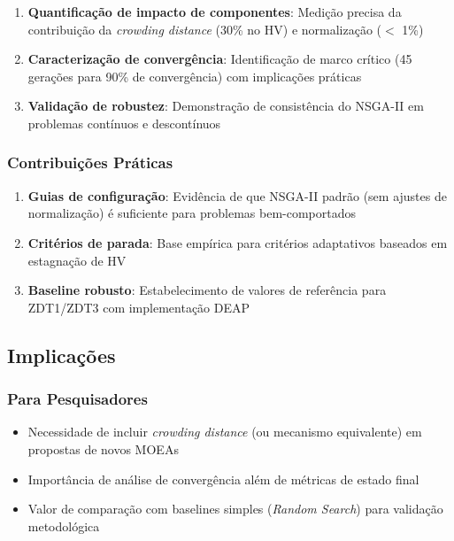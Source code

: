 \begin{enumerate}
    \item \textbf{Quantificação de impacto de componentes}: Medição precisa da contribuição da \textit{crowding distance} (30\% no HV) e normalização ($<$ 1\%)
    
    \item \textbf{Caracterização de convergência}: Identificação de marco crítico (45 gerações para 90\% de convergência) com implicações práticas
    
    \item \textbf{Validação de robustez}: Demonstração de consistência do NSGA-II em problemas contínuos e descontínuos
\end{enumerate}

\subsubsection{Contribuições Práticas}

\begin{enumerate}
    \item \textbf{Guias de configuração}: Evidência de que NSGA-II padrão (sem ajustes de normalização) é suficiente para problemas bem-comportados
    
    \item \textbf{Critérios de parada}: Base empírica para critérios adaptativos baseados em estagnação de HV
    
    \item \textbf{Baseline robusto}: Estabelecimento de valores de referência para ZDT1/ZDT3 com implementação DEAP
\end{enumerate}

\subsection{Implicações}

\subsubsection{Para Pesquisadores}

\begin{itemize}
    \item Necessidade de incluir \textit{crowding distance} (ou mecanismo equivalente) em propostas de novos MOEAs
    \item Importância de análise de convergência além de métricas de estado final
    \item Valor de comparação com baselines simples (\textit{Random Search}) para validação metodológica
\end{itemize}

